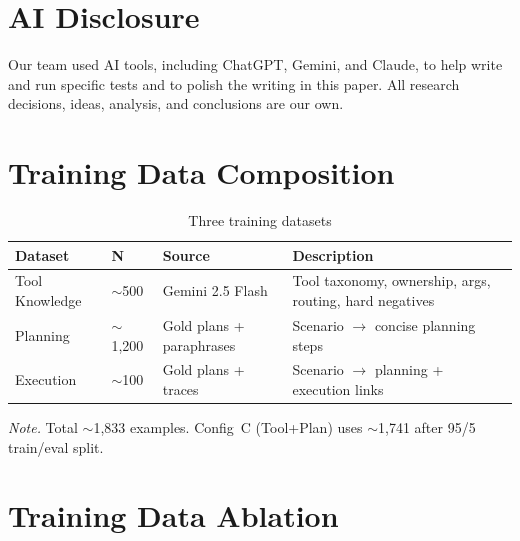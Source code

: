 \documentclass[conference]{IEEEtran}
\begin{document}
\section*{AI Disclosure}

Our team used AI tools, including ChatGPT, Gemini, and Claude, to help write and run specific tests and to polish the writing in this paper. All research decisions, ideas, analysis, and conclusions are our own.


\appendix

\section{Training Data Composition}
\label{app:data}

\begin{table}[!htbp]
\centering
\caption{Three training datasets}
\label{tab:three-training-datasets}
\footnotesize
\setlength{\tabcolsep}{3pt}
\renewcommand{\arraystretch}{1.15}
\begin{tabular}{p{}p{}p{}p{}}
\hline
\textbf{Dataset} & \textbf{N} & \textbf{Source} & \textbf{Description} \\
\hline
Tool Knowledge
& $\sim$500
& Gemini 2.5 Flash
& Tool taxonomy, ownership, args, routing, hard negatives \\
Planning
& $\sim$1,200
& Gold plans + paraphrases
& Scenario $\rightarrow$ concise planning steps \\
Execution
& $\sim$100
& Gold plans + traces
& Scenario $\rightarrow$ planning + execution links \\
\hline
\end{tabular}

\vspace{0.3em}
\begin{minipage}{0.95\columnwidth}
\footnotesize
\textit{Note.} Total $\sim$1,833 examples. Config~C (Tool+Plan) uses $\sim$1,741 after 95/5 train/eval split.
\end{minipage}
\end{table}


\section{Training Data Ablation}
\label{app:data-ablation}
\end{document}
